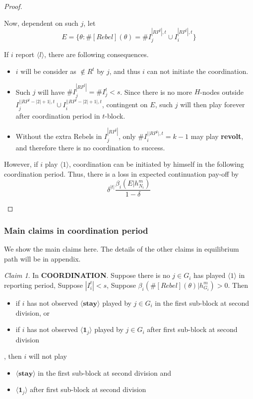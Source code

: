 \documentclass[12pt,letter]{article}
\theoremstyle{definition}
\theoremstyle{remark}
\theoremstyle{claim}
\newtheorem{claim}{Claim}
\begin{document}
\begin{proof}
\begin{itemize}
Now, dependent on such $j$, let
\[E=\{\theta:\#[Rebel](\theta)=\#I^{|RP^t|,t}_j\cup I^{|RP^t|,t}_i\}\]

If $i$ report $\langle l \rangle$, there are following consequences.

\begin{itemize}
\item $i$ will be consider as $\notin R^t$ by $j$, and thus $i$ can not initiate the coordination.
\item Such $j$ will have $\#I^{|RP^t|}_j=\#I^t_j<s$. Since there is no more $H$-nodes outside $I^{||RP^t-|2|+1|,t}_j\cup I^{||RP^t-|2|+1|,t}_i$, contingent on $E$, such $j$ will then play  forever after coordination period in $t$-block.
\item Without the extra Rebels in $I^{|RP^t|}_j$, only $\#I^{||RP^t|,t}_i= k-1$ may play \textbf{revolt}, and therefore there is no coordination to success. 
\end{itemize}

However, if $i$ play $\langle 1 \rangle$, coordination can be initiated by himself in the following coordination period. Thus, there is a loss in expected continuation pay-off by
\[\delta^{|t|}\frac{\beta_{i}(E|h^{m}_{N_i})}{1-\delta} \]
\end{itemize}

\end{proof}




\subsubsection{Main claims in coordination period}

We show the main claims here. The details of the other claims in equilibrium path will be in appendix.








\begin{claim} 
\label{claim_report_with_no_message_coordination_period}
In \textbf{COORDINATION}. Suppose there is no $j\in G_i$ has played $\langle 1 \rangle$ in reporting period, Suppose $|I^t_i|<s$, Suppose $\beta_{i}(\#[Rebel](\theta)|h^{m}_{G_i})>0$. Then 
\begin{itemize}
\item if $i$ has not observed $\langle \textbf{stay} \rangle$ played by $j\in G_i$ in the first sub-block at second division, or
\item if $i$ has not observed $\langle \mathbf{1}_j \rangle$ played by $j\in G_i$ after first sub-block at second division
\end{itemize}
, then $i$ will not play
\begin{itemize}
\item $\langle \textbf{stay} \rangle$  in the first sub-block at second division and
\item $\langle \mathbf{1}_j \rangle$  after first sub-block at second division
\end{itemize}
\end{claim}
\end{document}
